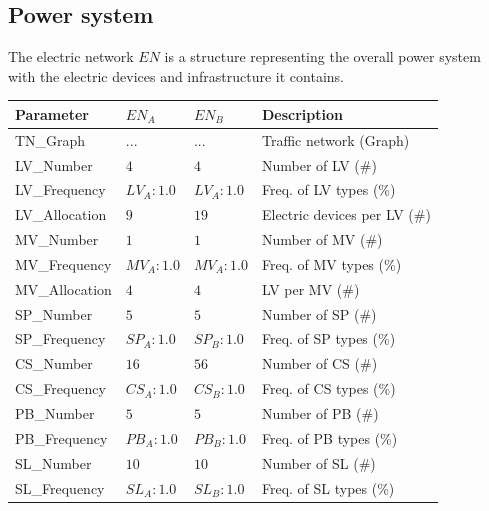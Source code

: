 \subsection{Power system}

The electric network $EN$ is a structure representing the overall power system with the electric devices and infrastructure it contains.

\begin{table}[h]
	\renewcommand{\arraystretch}{1.3}
	\centering
	\begin{tabular}{llll}
		\hline
		\textbf{Parameter}     & \textbf{$EN_{A}$} & \textbf{$EN_{B}$}       & \textbf{Description} \\ \hline
		TN\_Graph              & $...$ & $...$    	  & Traffic network (Graph)     \\
		LV\_Number             & $4$ & $4$            & Number of LV (\#)      \\
		LV\_Frequency          & $LV_{A}:1.0$ & $LV_{A}:1.0$                & Freq. of LV types (\%)      \\
		LV\_Allocation         & $9$ & $19$                 & Electric devices per LV (\#)      \\   
		MV\_Number             & $1$ & $1$        & Number of MV (\#)      \\ 
		MV\_Frequency          & $MV_{A}:1.0$ & $MV_{A}:1.0$                & Freq. of MV types (\%)      \\
		MV\_Allocation         & $4$ & $4$                     & LV per MV (\#)      \\   
		SP\_Number             & $5$ & $5$         & Number of SP (\#)      \\ 
		SP\_Frequency          & $SP_{A}:1.0$ & $SP_{B}:1.0$                & Freq. of SP types (\%)       \\  
		CS\_Number             & $16$  & $56$           & Number of CS (\#)      \\
		CS\_Frequency          & $CS_{A}:1.0$  & $CS_{B}:1.0$               & Freq. of CS types (\%)       \\   
		PB\_Number          & $5$  & $5$              & Number of PB (\#)      \\
		PB\_Frequency          & $PB_{A}:1.0$ & $PB_{B}:1.0$              & Freq. of PB types (\%)       \\ 
		SL\_Number          & $10$ & $10$              & Number of SL (\#)      \\
		SL\_Frequency          & $SL_{A}:1.0$ & $SL_{B}:1.0$              & Freq. of SL types (\%)       \\  \hline  
	\end{tabular}
\end{table}

